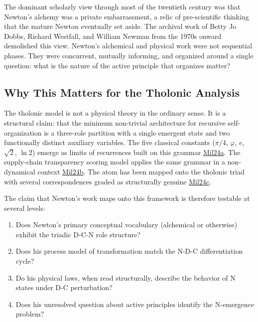 \documentclass[12pt]{article}
\providecommand{\tightlist}{%
  \setlength{\itemsep}{0pt}\setlength{\parskip}{0pt}}
\begin{document}
The dominant scholarly view through most of the twentieth century was
that Newton's alchemy was a private embarrassment, a relic of
pre-scientific thinking that the mature Newton eventually set aside. The
archival work of Betty Jo Dobbs, Richard Westfall, and William Newman
from the 1970s onward demolished this view. Newton's alchemical and
physical work were not sequential phases. They were concurrent, mutually
informing, and organized around a single question: what is the nature of
the active principle that organizes matter?

\subsection{Why This Matters for the Tholonic Analysis}\label{why-this-matters-for-the-tholonic-analysis}

The tholonic model is not a physical theory in the ordinary sense. It is
a structural claim: that the minimum non-trivial architecture for
recursive self-organization is a three-role partition with a single
emergent state and two functionally distinct auxiliary variables. The
five classical constants (\(\pi/4\), \(\varphi\), \(e\), \(\sqrt{2}\),
\(\ln 2\)) emerge as limits of recurrences built on this grammar
\href{https://github.com/baardev/truevalue/blob/main/docnav/Research/papers/1_recursive-tholonic-five-constants/1_recursive-tholonic-five-constants.pdf}{Mil24a}.
The supply-chain transparency scoring model applies the same grammar in
a non-dynamical context
\href{https://github.com/baardev/truevalue/blob/main/docnav/Research/papers/2_supply-chain-transparency-tvpci/2_supply-chain-transparency-tvpci.pdf}{Mil24b}.
The atom has been mapped onto the tholonic triad with several
correspondences graded as structurally genuine
\href{https://github.com/baardev/truevalue/blob/main/docnav/Research/papers/8_atom-as-tholon-measurable-phenomena/8_atom-as-tholon-measurable-phenomena.pdf}{Mil24c}.

The claim that Newton's work maps onto this framework is therefore
testable at several levels:

\begin{enumerate}
\def\labelenumi{\arabic{enumi}.}
\tightlist
\item
  Does Newton's primary conceptual vocabulary (alchemical or otherwise)
  exhibit the triadic D-C-N role structure?
\item
  Does his process model of transformation match the N-D-C
  differentiation cycle?
\item
  Do his physical laws, when read structurally, describe the behavior of
  N states under D-C perturbation?
\item
  Does his unresolved question about active principles identify the
  N-emergence problem?
\end{enumerate}
\end{document}
